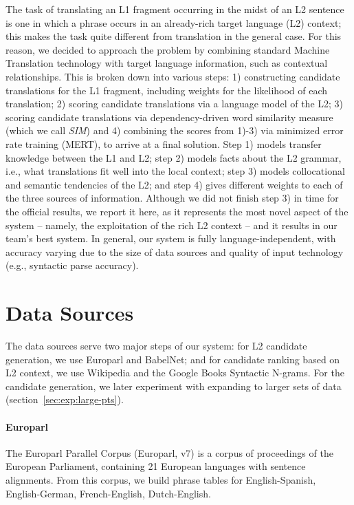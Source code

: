 \documentclass[11pt]{article}
\begin{document}
The task of translating an L1 fragment occurring in the midst of an L2 sentence is one in which a phrase occurs in an already-rich target language (L2) context; this makes the task quite different from translation in the general case. For this reason, we decided to approach the problem by combining standard Machine Translation technology with target language information,
such as contextual relationships. 
This is broken down into various steps: 1) constructing candidate translations for the L1 fragment, including weights for the likelihood of each translation; 2) scoring candidate translations via a language model of the L2; 3) scoring candidate translations via dependency-driven word similarity measure \cite{lin:98} (which we call \textit{SIM})
and 4) combining the scores from 1)-3) via minimized error rate training (MERT), to arrive at a final solution.  Step 1) models transfer knowledge between the L1 and L2; step 2) models facts about the L2 grammar, i.e., what translations fit well into the local context; step 3) models collocational and semantic tendencies of the L2; and step 4)  gives different weights to each of the three sources of information.  Although we did not finish step 3) in time for the official results, we report it here, as it represents the most novel aspect of the system -- namely, the exploitation of the rich L2 context -- and it results in our team's best system.  In general, our system is fully language-independent, with accuracy varying due to the size of data sources and quality of input technology (e.g., syntactic parse accuracy).

\section{Data Sources}
The data sources serve two major steps of our system: for L2 candidate generation, we use Europarl and BabelNet; and for candidate ranking based on L2 context, we use Wikipedia and the Google Books Syntactic N-grams.  For the candidate generation, we later experiment with expanding to larger sets of data (section~\ref{sec:exp:large-pts}).

\paragraph{Europarl}  %
The Europarl Parallel Corpus (Europarl, v7) \cite{koehn:05} is a corpus of proceedings of the European Parliament, containing 21 European languages with sentence alignments.
From this corpus, we build phrase tables for English-Spanish, English-German, French-English, Dutch-English.
\end{document}
